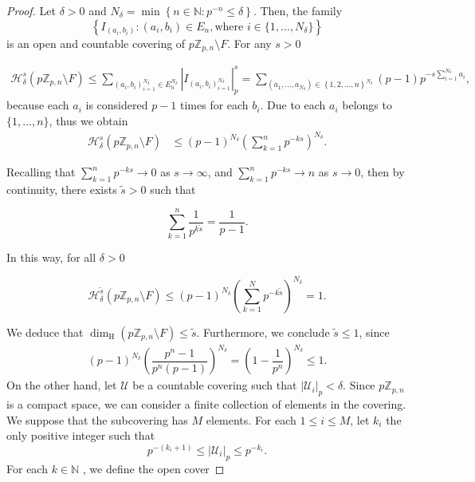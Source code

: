 \documentclass[11pt]{amsart}
\theoremstyle{remark}
\numberwithin{equation}{section}
\newcommand{\N}{\mathbb{N}}
\newcommand{\Z}{\mathbb{Z}}
\newcommand{\Hcali}{\mathcal{H}}
\newcommand{\Ucali}{\mathcal{U}}
\begin{document}
\begin{proof}
    Let $\delta>0$ and $N_\delta=\min\left\{n\in \N:p^{-n}\leq \delta \right\}$. Then, the family
    $$\left\{I_{(a_i,b_i)}:(a_i,b_i)\in E_{n},\text{where } i\in \{1,...,N_\delta\} \right\}$$
    is an open and countable covering of $p\Z_{p,n}\setminus F$. For any $s>0$

    \begin{align*}
        \Hcali_\delta^s\left(p\Z_{p,n}\setminus F \right) \leq \sum_{(a_i,b_i)_{i=1}^{N_{\delta}}\in E_{n}^{N_\delta}}\left|I_{(a_i,b_i)_{i=1}^{N_{\delta}}} \right|_p^s = \sum_{(a_1,...,a_{N_\delta})\in \left\{1,2,...,n\right\}^{N_\delta}} (p-1)p^{-s\sum_{i=1}^{N_\delta}a_i},
    \end{align*} because each $a_{i}$ is considered $p-1$ times for each $b_{i}$. Due to each $a_{i}$ belongs to $\{1,...,n\}$, thus we obtain
    \begin{align*}
    \Hcali_\delta^s\left(p\Z_{p,n}\setminus F \right)     
        &\leq (p-1)^{N_\delta}\left(\sum_{k=1}^{n}p^{-ks} \right)^{N_\delta}.
    \end{align*}

Recalling that $\sum_{k=1}^n p^{-ks}\to 0$ as $s\to \infty$, and $\sum_{k=1}^{n}p^{-ks}\to n$ as $s\to 0$, then by continuity, there exists $\tilde s>0$ such that

\begin{equation}\label{Ecu2BowenFormular}
    \sum_{k=1}^n\dfrac{1}{p^{k\tilde s}}=\dfrac{1}{p-1}.
\end{equation}





In this way, for all $\delta>0$ 

$$\Hcali_\delta^{\tilde{s}}(p\Z_{p,n}\setminus F)\leq (p-1)^{N_\delta}\left( \sum_{k=1}^{N}p^{-k\tilde{s}}\right)^{N_\delta}=1.$$

We deduce that $\dim_{\mathrm{H}}(p\Z_{p,n}\setminus F)\leq \tilde{s}$. Furthermore, we conclude $\tilde{s}\leq 1$,  since 
\begin{align*}
    (p-1)^{N_\delta}\left(\dfrac{p^n-1}{p^n(p-1)} \right)^{N_\delta}=\left(1-\dfrac{1}{p^n}\right)^{N_\delta}\leq 1.
\end{align*} 
On the other hand, let $\Ucali$ be a countable covering such that $|\Ucali_i|_{p}<\delta.$ Since $p\Z_{p,n}$ is a compact space, we can consider a finite collection of elements in the covering. We suppose that the subcovering has $M$ elements. For each $1\leq i \leq M$, let $k_i$ the only positive integer such that 
$$p^{-(k_i+1)}\leq |\Ucali_i|_p\leq p^{-k_i}.$$
For each $k\in \N$ , we define the open cover


\end{proof}
\end{document}
